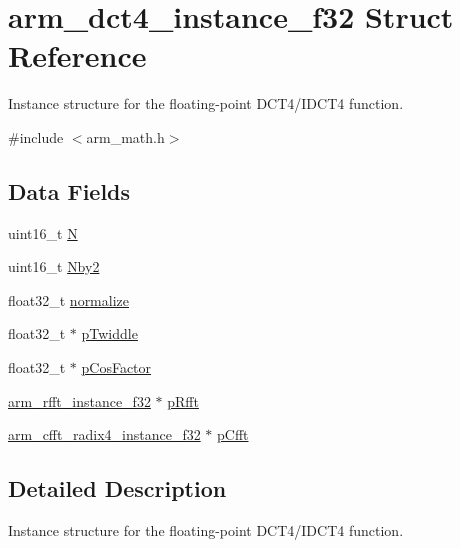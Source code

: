 \hypertarget{structarm__dct4__instance__f32}{}\section{arm\+\_\+dct4\+\_\+instance\+\_\+f32 Struct Reference}
\label{structarm__dct4__instance__f32}


Instance structure for the floating-\/point D\+C\+T4/\+I\+D\+C\+T4 function.  




{\ttfamily \#include $<$arm\+\_\+math.\+h$>$}

\subsection*{Data Fields}
\begin{DoxyCompactItemize}
\item 
uint16\+\_\+t \mbox{\hyperlink{structarm__dct4__instance__f32_a37d49571fe35012087153c093705cd11}{N}}
\item 
uint16\+\_\+t \mbox{\hyperlink{structarm__dct4__instance__f32_afa64b1618089e35c2b55cff71cb29715}{Nby2}}
\item 
float32\+\_\+t \mbox{\hyperlink{structarm__dct4__instance__f32_a1bf2ed86ef2c3dd83af606bb3f520f2a}{normalize}}
\item 
float32\+\_\+t $\ast$ \mbox{\hyperlink{structarm__dct4__instance__f32_aca581481fccdff0f557f54a3ef20d967}{p\+Twiddle}}
\item 
float32\+\_\+t $\ast$ \mbox{\hyperlink{structarm__dct4__instance__f32_abd73b9d7fb4951ba086e4820c2a48eb0}{p\+Cos\+Factor}}
\item 
\mbox{\hyperlink{structarm__rfft__instance__f32}{arm\+\_\+rfft\+\_\+instance\+\_\+f32}} $\ast$ \mbox{\hyperlink{structarm__dct4__instance__f32_ad4cd7c85eea3f7c5fff4630bbd979e6a}{p\+Rfft}}
\item 
\mbox{\hyperlink{structarm__cfft__radix4__instance__f32}{arm\+\_\+cfft\+\_\+radix4\+\_\+instance\+\_\+f32}} $\ast$ \mbox{\hyperlink{structarm__dct4__instance__f32_ab7bd4d374a1780dea50efd3e7ac220be}{p\+Cfft}}
\end{DoxyCompactItemize}


\subsection{Detailed Description}
Instance structure for the floating-\/point D\+C\+T4/\+I\+D\+C\+T4 function. 

